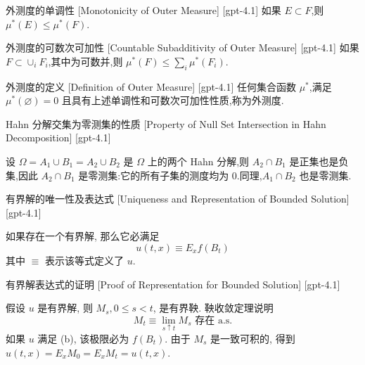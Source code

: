 \documentclass[UTF8]{ctexart}
\begin{document}
    
    
    \begin{ppt}
        {外测度的单调性}
        [Monotonicity of Outer Measure]
        [gpt-4.1]
        如果 $E \subset F$,则 $\mu^*(E) \leq \mu^*(F)$.
    \end{ppt}
    
    
    
    \begin{ppt}
        {外测度的可数次可加性}
        [Countable Subadditivity of Outer Measure]
        [gpt-4.1]
        如果 $F \subset \cup_{i} F_{i}$,其中为可数并,则 $\mu^*(F) \leq \sum_{i} \mu^*(F_{i})$.
    \end{ppt}
    
    
    
    \begin{dfn}
        {外测度的定义}
        [Definition of Outer Measure]
        [gpt-4.1]
        任何集合函数 $\mu^*$,满足 $\mu^*(\varnothing) = 0$ 且具有上述单调性和可数次可加性性质,称为外测度.
    \end{dfn}
    
    
    
    \begin{ppt}
        {Hahn 分解交集为零测集的性质}
        [Property of Null Set Intersection in Hahn Decomposition]
        [gpt-4.1]
        
设 $\Omega = A_{1} \cup B_{1} = A_{2} \cup B_{2}$ 是 $\Omega$ 上的两个 Hahn 分解,则 $A_{2} \cap B_{1}$ 是正集也是负集,因此 $A_{2} \cap B_{1}$ 是零测集:它的所有子集的测度均为 0.同理,$A_{1} \cap B_{2}$ 也是零测集.

    \end{ppt}
    
    
    
    \begin{thm}
        {有界解的唯一性及表达式}
        [Uniqueness and Representation of Bounded Solution]
        [gpt-4.1]
        
如果存在一个有界解, 那么它必满足
\[
u(t, x) \equiv E_x f(B_t)
\]
其中 $\equiv$ 表示该等式定义了 $
u$.

    \end{thm}
    
    
    
    \begin{prf}
        {有界解表达式的证明}
        [Proof of Representation for Bounded Solution]
        [gpt-4.1]
        
假设 $u$ 是有界解, 则 $M_s, 0 \leq s < t$, 是有界鞅.
鞅收敛定理说明
\[
M_t \equiv \lim_{s \uparrow t} M_s \text{ 存在 a.s.}
\]
如果 $u$ 满足 (b), 该极限必为 $f(B_t)$.
由于 $M_s$ 是一致可积的, 得到 $u(t, x) = E_x M_0 = E_x M_t = 
u(t, x)$.

    \end{prf}
    
\end{document}

